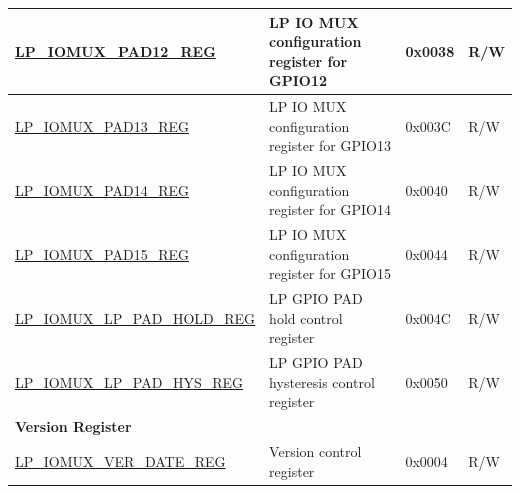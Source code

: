 \begin{longtable}{ | p{6cm} | p{7.2cm} | p{1.3cm} | p{1cm} | }
\hyperref[regdesc:LPIOMUXPADNREG]{LP\_IOMUX\_PAD12\_REG} & LP IO MUX configuration register for GPIO12 & 0x0038 & R/W \\ \hline
\hyperref[regdesc:LPIOMUXPADNREG]{LP\_IOMUX\_PAD13\_REG} & LP IO MUX configuration register for GPIO13 & 0x003C & R/W \\ \hline
\hyperref[regdesc:LPIOMUXPADNREG]{LP\_IOMUX\_PAD14\_REG} & LP IO MUX configuration register for GPIO14 & 0x0040 & R/W \\ \hline
\hyperref[regdesc:LPIOMUXPADNREG]{LP\_IOMUX\_PAD15\_REG} & LP IO MUX configuration register for GPIO15 & 0x0044 & R/W \\ \hline
\hyperref[regdesc:LPIOMUXLPPADHOLDREG]{LP\_IOMUX\_LP\_PAD\_HOLD\_REG} & LP GPIO PAD hold control register & 0x004C & R/W \\ \hline
\hyperref[regdesc:LPIOMUXLPPADHYSREG]{LP\_IOMUX\_LP\_PAD\_HYS\_REG} & LP GPIO PAD hysteresis control register & 0x0050 & R/W \\ \hline
\multicolumn{4}{|l|}{\textbf{Version Register}} \\ \hline
\hyperref[regdesc:LPIOMUXVERDATEREG]{LP\_IOMUX\_VER\_DATE\_REG} & Version control register & 0x0004 & R/W \\ \hline
\end{longtable}
